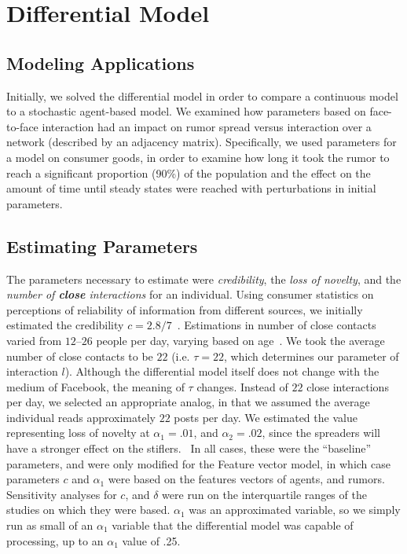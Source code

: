 \section{Differential Model }
\label{sec:diffmodel}

\subsection{Modeling Applications}
\label{subsec:diffmodeapp}

Initially, we solved the differential model in order to compare a continuous model to a stochastic agent-based model.
We examined how parameters based on face-to-face interaction had an impact on rumor spread versus interaction over a network (described by an adjacency matrix).
Specifically, we used parameters for a model on consumer goods, in order to examine how long it took the rumor to reach a significant proportion (90\%) of the population and the effect on the amount of time until steady states were reached with perturbations in initial parameters.

\subsection{Estimating Parameters}
\label{subsec:diffmodeeparam}

The parameters necessary to estimate were \textit{credibility}, the
\textit{loss of novelty}, and the \textit{number of \textbf{close} interactions} for an individual.
Using consumer statistics on perceptions of reliability of information from different sources, we initially estimated the credibility $ c = 2.8/7 $~\cite{kamins-1997}.
Estimations in number of close contacts varied from $ 12 $--$ 26 $ people per day, varying based on age~\cite{cahill-1996, mossong-2008, edmunds-2006}.
We took the average number of close contacts to be $ 22 $ (i.e. $ \tau = 22 $, which determines our parameter of interaction $ l $).
Although the differential model itself does not change with the medium of Facebook, the meaning of $ \tau $ changes.
Instead of $ 22 $ close interactions per day, we selected an appropriate analog, in that we assumed the average individual reads approximately $ 22 $ posts per day.
We estimated the value representing loss of novelty at $ \alpha_1 = .01 $, and  $ \alpha_2 = .02 $, since the spreaders will have a stronger effect on the stiflers.
\
In all cases, these were the ``baseline'' parameters, and were only modified for the Feature vector model, in which case parameters $ c $ and $ \alpha_1 $  were based on the features vectors of agents, and rumors.
Sensitivity analyses for $ c $, and $ \delta $ were run on the interquartile ranges of the studies on which they were based.
$ \alpha_1 $ was an approximated variable, so we simply run as small of an $ \alpha_1 $ variable that the differential model was capable of processing, up to an $ \alpha_1 $ value of .25.
